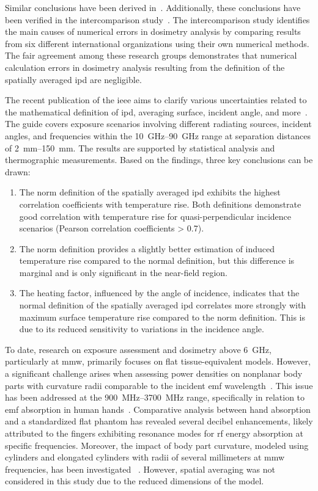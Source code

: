Similar conclusions have been derived in~\cite{DeSantis2022On}.
Additionally, these conclusions have been verified in the intercomparison study~\cite{Li2021Intercomparison}.
The intercomparison study identifies the main causes of numerical errors in dosimetry analysis by comparing results from six different international organizations using their own numerical methods.
The fair agreement among these research groups demonstrates that numerical calculation errors in dosimetry analysis resulting from the definition of the spatially averaged \gls{ipd} are negligible.

The recent publication of the \gls{ieee} aims to clarify various uncertainties related to the mathematical definition of \gls{ipd}, averaging surface, incident angle, and more~\cite{IEEE2021Guide}.
The guide covers exposure scenarios involving different radiating sources, incident angles, and frequencies within the \SIrange{10}{90}{\GHz} range at separation distances of \SIrange{2}{150}{\mm}.
The results are supported by statistical analysis and thermographic measurements.
Based on the findings, three key conclusions can be drawn:
\begin{enumerate}
    \item The norm definition of the spatially averaged \gls{ipd} exhibits the highest correlation coefficients with temperature rise. Both definitions demonstrate good correlation with temperature rise for quasi-perpendicular incidence scenarios (Pearson correlation coefficients > \num{0.7}).
    \item The norm definition provides a slightly better estimation of induced temperature rise compared to the normal definition, but this difference is marginal and is only significant in the near-field region.
    \item The heating factor, influenced by the angle of incidence, indicates that the normal definition of the spatially averaged \gls{ipd} correlates more strongly with maximum surface temperature rise compared to the norm definition. This is due to its reduced sensitivity to variations in the incidence angle.
\end{enumerate}

To date, research on exposure assessment and dosimetry above \SI{6}{\GHz}, particularly at \gls{mmw}, primarily focuses on flat tissue-equivalent models.
However, a significant challenge arises when assessing power densities on nonplanar body parts with curvature radii comparable to the incident \gls{emf} wavelength~\cite{Sacco2022Exposure}.
This issue has been addressed at the \SIrange{900}{3700}{\MHz} range, specifically in relation to \gls{emf} absorption in human hands~\cite{Li2012Mechanisms}.
Comparative analysis between hand absorption and a standardized flat phantom has revealed several decibel enhancements, likely attributed to the fingers exhibiting resonance modes for \gls{rf} energy absorption at specific frequencies.
Moreover, the impact of body part curvature, modeled using cylinders and elongated cylinders with radii of several millimeters at \gls{mmw} frequencies, has been investigated ~\cite{Sacco2022Exposure}.
However, spatial averaging was not considered in this study due to the reduced dimensions of the model.

